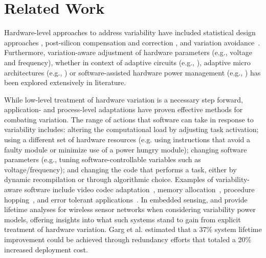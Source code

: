 \section{Related Work}
\label{sec:relatedwork}

Hardware-level approaches to address variability have included statistical design approaches \cite{Neiroukh:2005,Datta:2005,Kang:2006}, post-silicon compensation and correction \cite{Gregg:2007,Khandelwal:2007,Tschanz:2002}, and variation avoidance~\cite{Choi:2004,Bhunia:2007,Ghosh:2007}. Furthermore, variation-aware adjustment of hardware parameters (e.g., voltage and frequency), whether in context of adaptive circuits (e.g., \cite{Borkar:2003,Ghosh:2007,Agarwal:2005}), adaptive micro architectures (e.g., \cite{Sylvester:2006,Ernst:2003,Meng:2006,Tiwari:2007}) or software-assisted hardware power management (e.g., \cite{Dighe:2010,Chandra:2009,Teodorescu:2008}) has been explored extensively in literature. 

While low-level treatment of hardware variation is a necessary step forward, application- and process-level adaptations have proven effective methods for combating variation.  The range of actions that software can take in response to variability includes:  altering the computational load by adjusting task activation; using a different set of hardware resources (e.g. using instructions that avoid a faulty module or minimize use of a power hungry module); changing software parameters (e.g., tuning software-controllable  variables such as voltage/frequency); and changing the code that performs a task, either by dynamic recompilation or through algorithmic choice.  Examples of variability-aware software include video codec adaptation~\cite{Pant:2011}, memory allocation~\cite{Bathen:2012}, procedure hopping~\cite{Rahimi:2012}, and error tolerant applications~\cite{Cho:2012}. In embedded sensing, \cite{matsuda2006} and \cite{garg2007} provide lifetime analyses for wireless sensor networks when considering variability power models, offering insights into what such systems stand to gain from explicit treatment of hardware variation.  Garg et al. estimated that a 37\% system lifetime improvement could be achieved through redundancy efforts that totaled a 20\% increased deployment cost. 

